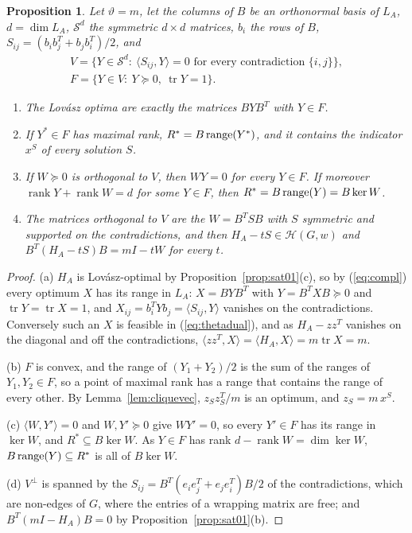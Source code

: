 \documentclass[11pt]{article}
\newtheorem{prop}[thm]{Proposition}
\theoremstyle{definition}
\theoremstyle{remark}
\newcommand{\Hc}{\mathcal{H}}
\DeclareMathOperator{\tr}{tr}
\DeclareMathOperator{\rank}{rank}
\begin{document}
\begin{prop}
\label{prop:face}
Let $\vartheta=m$, let the columns of $B$ be an orthonormal basis of $L_A$,
$d=\dim L_A$, $\mathcal S^d$ the symmetric $d\times d$ matrices, $b_i$ the
rows of $B$, $S_{ij}=(b_ib_j^T+b_jb_i^T)/2$, and
\begin{gather*}
V=\{Y\in\mathcal S^d:\ \langle S_{ij},Y\rangle=0 \mbox{ for every
  contradiction } \{i,j\}\},\\
F=\{Y\in V:\ Y\succeq0,\ \tr Y=1\}.
\end{gather*}
\begin{enumerate}
\item[(a)] The Lov\'asz optima are exactly the matrices $BYB^T$ with $Y\in F$.
\item[(b)] If $Y^*\in F$ has maximal rank, $R^*=B\,{\rm range}(Y^*)$, and it
contains the indicator $x^S$ of every solution $S$.
\item[(c)] If $W\succeq0$ is orthogonal to $V$, then $WY=0$ for every
$Y\in F$. If moreover $\rank Y+\rank W=d$ for some $Y\in F$, then
$R^*=B\,{\rm range}(Y)=B\ker W$.
\item[(d)] The matrices orthogonal to $V$ are the $W=B^TSB$ with $S$
symmetric and supported on the contradictions, and then $H_A-tS\in\Hc(G,w)$
and $B^T(H_A-tS)B=mI-tW$ for every $t$.
\end{enumerate}
\end{prop}
\begin{proof}
(a) $H_A$ is Lov\'asz-optimal by Proposition~\ref{prop:sat01}(c), so by
(\ref{eq:compl}) every optimum $X$ has its range in $L_A$: $X=BYB^T$ with
$Y=B^TXB\succeq0$ and $\tr Y=\tr X=1$, and
$X_{ij}=b_i^TYb_j=\langle S_{ij},Y\rangle$ vanishes on the contradictions.
Conversely such an $X$ is feasible in (\ref{eq:thetadual}), and as
$H_A-zz^T$ vanishes on the diagonal and off the contradictions,
$\langle zz^T,X\rangle=\langle H_A,X\rangle=m\tr X=m$.

(b) $F$ is convex, and the range of $(Y_1+Y_2)/2$ is the sum of the ranges
of $Y_1,Y_2\in F$, so a point of maximal rank has a range that contains the
range of every other. By Lemma~\ref{lem:cliquevec}, $z_Sz_S^T/m$ is an
optimum, and $z_S=m\,x^S$.

(c) $\langle W,Y'\rangle=0$ and $W,Y'\succeq0$ give $WY'=0$, so every
$Y'\in F$ has its range in $\ker W$, and $R^*\subseteq B\ker W$. As $Y\in F$
has rank $d-\rank W=\dim\ker W$, $B\,{\rm range}(Y)\subseteq R^*$ is all of
$B\ker W$.

(d) $V^\perp$ is spanned by the $S_{ij}=B^T(e_ie_j^T+e_je_i^T)B/2$ of the
contradictions, which are non-edges of $G$, where the entries of a wrapping
matrix are free; and $B^T(mI-H_A)B=0$ by Proposition~\ref{prop:sat01}(b).
\end{proof}
\end{document}
